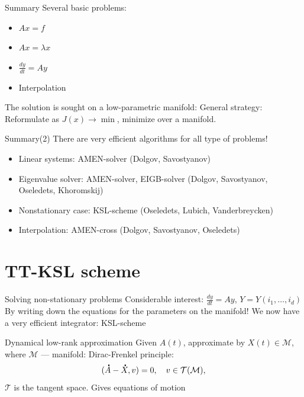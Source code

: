 \documentclass{beamer}[14pt, presentation]
\newcommand*{\dt}[1]{\accentset{\mbox{\large\bfseries .}}{#1}}
\begin{document}
\begin{frame}[label=sec-6-5]{Summary}
Several basic problems:
\begin{itemize}
\item $Ax = f$
\item $Ax = \lambda x$
\item $\frac{dy}{dt} = Ay$
\item Interpolation
\end{itemize}
The solution is sought on a low-parametric manifold: 
\vskip 2mm
General strategy:
\vskip 2mm
Reformulate as $J(x) \rightarrow \min$, minimize over a manifold.
\end{frame}

\begin{frame}[label=sec-6-6]{Summary(2)}
There are \alert{very efficient algorithms} for all type of problems!
\begin{itemize}
\item Linear systems: AMEN-solver (Dolgov, Savostyanov)
\item Eigenvalue solver: AMEN-solver, EIGB-solver (Dolgov, Savostyanov,
Oseledets, Khoromskij)
\item Nonstationary case: KSL-scheme (Oseledets, Lubich, Vanderbreycken)
\item Interpolation: AMEN-cross (Dolgov, Savostyanov, Oseledets)
\end{itemize}
\end{frame}

\section{TT-KSL scheme}
\label{sec-7}
\begin{frame}[label=sec-7-1]{Solving non-stationary problems}
Considerable interest:
\vskip 2mm
$\frac{dy}{dt} = Ay$,
\vskip 2mm
$Y = Y(i_1,\ldots,i_d)$
\vskip 2mm
By writing down the equations for the parameters on the manifold!
\vskip 2mm
We now have a \alert{very efficient integrator}: \vskip 2mm KSL-scheme
\end{frame}

\begin{frame}[label=sec-7-2]{Dynamical low-rank approximation}
 Given $A(t)$, approximate by $X(t) \in \mathcal{M}$, \vskip 2mm where
 $\mathcal{M}$ --- manifold:
 \vskip 2mm
Dirac-Frenkel principle:
\begin{equation*}
 (\dt{A} - \dt{X}, v) = 0, \quad v \in \mathcal{T}(\mathcal{M}),
\end{equation*}
$\mathcal{T}$ is the tangent space.
\vskip 2mm
\alert{Gives equations of motion}
\end{frame}
\end{document}
